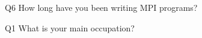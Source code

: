 \begin{description}%
\item{Q6} How long have you been writing MPI programs?%
\item{Q1} What is your main occupation?%
\end{description}%
